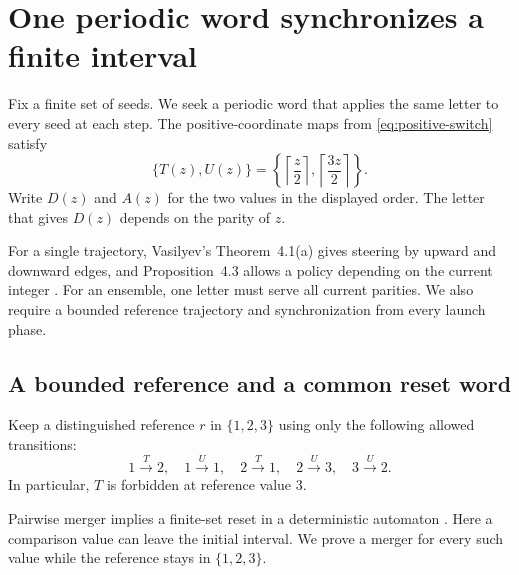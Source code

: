 \section{One periodic word synchronizes a finite interval}
\label{sec:synchronization}

Fix a finite set of seeds. We seek a periodic word that applies the same
letter to every seed at each step. The positive-coordinate maps from
\eqref{eq:positive-switch} satisfy
\[
 \{T(z),U(z)\}
 =\left\{\left\lceil\frac z2\right\rceil,
          \left\lceil\frac{3z}2\right\rceil\right\}.
\]
Write $D(z)$ and $A(z)$ for the two values in the displayed order.
The letter that gives $D(z)$ depends on the parity of $z$.

For a single trajectory, Vasilyev's Theorem~4.1(a) gives steering by
upward and downward edges, and Proposition~4.3 allows a policy depending
on the current integer \cite{vasilyev-2026}. For an ensemble, one letter
must serve all current parities. We also require a bounded reference
trajectory and synchronization from every launch phase.

\subsection{A bounded reference and a common reset word}

Keep a distinguished reference $r$ in $\{1,2,3\}$ using only the
following allowed transitions:
\begin{equation}\label{eq:reference-controller}
 1\xrightarrow{T}2,\quad 1\xrightarrow{U}1,\quad
 2\xrightarrow{T}1,\quad 2\xrightarrow{U}3,\quad
 3\xrightarrow{U}2.
\end{equation}
In particular, $T$ is forbidden at reference value $3$.

Pairwise merger implies a finite-set reset in a deterministic automaton
\cite[Theorem~2]{cerny-1964}. Here a comparison value can leave the
initial interval. We prove a merger for every such value while the
reference stays in $\{1,2,3\}$.

